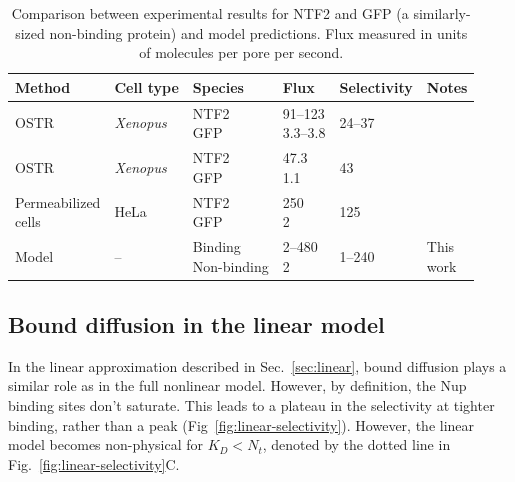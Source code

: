\begin{table}[b!]
  \caption{Comparison between experimental results for NTF2 and GFP
    (a similarly-sized non-binding protein) and model
    predictions. Flux measured in units of molecules per pore per
    second.}
    \label{table:NTF2-flux}
    \begin{tabular}{p{2.1cm}p{1.2cm}p{1.7cm}p{0.9cm}p{1.6cm}p{0.8cm}}
      Method & Cell type & Species & Flux & Selectivity & Notes\\
      \hline
      OSTR & \textit{Xenopus} & \makecell[cl]{NTF2\\GFP} & \makecell[cl]{91--123\\3.3--3.8} & 24--37 
                         &\cite{siebrasse02}
      \\
      OSTR & \textit{Xenopus} & \makecell[cl]{NTF2\\GFP} & \makecell[cl]{47.3\\1.1} & 43 &  \cite{kiskin03}\\
      \makecell[cl]{Permeabilized \\ cells}  & HeLa &
                                                    \makecell[cl]{NTF2\\GFP} & \makecell[cl]{250\\2} & 125 & \cite{ribbeck01}\\
      Model & -- & \makecell[cl]{Binding\\Non-binding} & \makecell[cl]{2--480\\2} & 1--240 & \makecell[cl]{This\\work}\\
    \end{tabular}
\end{table}

\subsection{Bound diffusion in the linear model}

In the linear approximation described in Sec.~\ref{sec:linear}, bound diffusion plays a similar role as in the full nonlinear model.  However, by definition, the Nup binding sites don't saturate.  This leads to a plateau in the selectivity at tighter binding, rather than a peak (Fig~\ref{fig:linear-selectivity}).  However, the linear model becomes non-physical for $K_D < N_t$, denoted by the dotted line in Fig.~\ref{fig:linear-selectivity}C.

